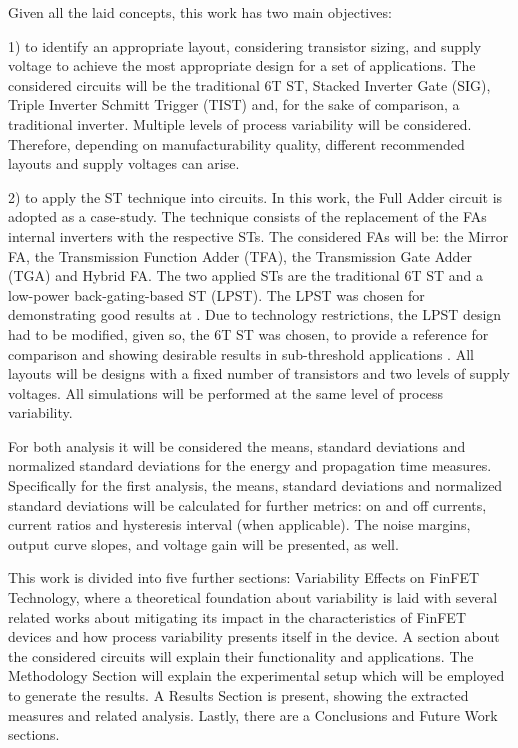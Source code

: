 \documentclass[diss,pgmicro,english]{iiufrgs}
\begin{document}
	Given all the laid concepts, this work has two main objectives:

	1) to identify an appropriate layout, considering transistor sizing, and supply voltage to achieve the most appropriate design for a set of applications. The considered circuits will be the traditional 6T ST, Stacked Inverter Gate (SIG), Triple Inverter Schmitt Trigger (TIST) and, for the sake of comparison, a traditional inverter. Multiple levels of process variability will be considered. Therefore, depending on manufacturability quality, different recommended layouts and supply voltages can arise.

	2) to apply the ST technique into circuits. In this work, the Full Adder circuit is adopted as a case-study. The technique consists of the replacement of the FAs internal inverters with the respective STs. The considered FAs will be: the Mirror FA, the Transmission Function Adder (TFA), the Transmission Gate Adder (TGA) and Hybrid FA. The two applied STs are the traditional 6T ST and a low-power back-gating-based ST (LPST). The LPST was chosen for demonstrating good results at \cite{dokania2015circuit}. Due to technology restrictions, the LPST design had to be modified, given so, the 6T ST was chosen, to provide a reference for comparison and showing desirable results in sub-threshold applications \cite{lotze2017ultra}. All layouts will be designs with a fixed number of transistors and two levels of supply voltages. All simulations will be performed at the same level of process variability.

For both analysis it will be considered the means, standard deviations and normalized standard deviations for the energy and propagation time measures. Specifically for the first analysis, the means, standard deviations and normalized standard deviations will be calculated for further metrics: on and off currents, current ratios and hysteresis interval (when applicable). The noise margins, output curve slopes, and voltage gain will be presented, as well.

    This work is divided into five further sections: Variability Effects on FinFET Technology, where a theoretical foundation about variability is laid with several related works about mitigating its impact in the characteristics of FinFET devices and how process variability presents itself in the device. A section about the considered circuits will explain their functionality and applications. The Methodology Section will explain the experimental setup which will be employed to generate the results. A Results Section is present, showing the extracted measures and related analysis. Lastly, there are a Conclusions and Future Work sections.
\end{document}
